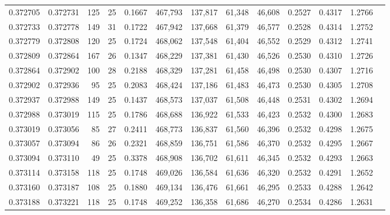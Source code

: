 \begin{tabular}{rrrrrrrrrrrrr}
0.372705 & 0.372731 &   125 &  25 &                                     0.1667 & 467,793 & 137,817 &  61,348 &  46,608 & 0.2527 & 0.4317 & 1.2766 \\
0.372733 & 0.372778 &   149 &  31 &                                     0.1722 & 467,942 & 137,668 &  61,379 &  46,577 & 0.2528 & 0.4314 & 1.2752 \\
0.372779 & 0.372808 &   120 &  25 &                                     0.1724 & 468,062 & 137,548 &  61,404 &  46,552 & 0.2529 & 0.4312 & 1.2741 \\
0.372809 & 0.372864 &   167 &  26 &                                     0.1347 & 468,229 & 137,381 &  61,430 &  46,526 & 0.2530 & 0.4310 & 1.2726 \\
0.372864 & 0.372902 &   100 &  28 &                                     0.2188 & 468,329 & 137,281 &  61,458 &  46,498 & 0.2530 & 0.4307 & 1.2716 \\
0.372902 & 0.372936 &    95 &  25 &                                     0.2083 & 468,424 & 137,186 &  61,483 &  46,473 & 0.2530 & 0.4305 & 1.2708 \\
0.372937 & 0.372988 &   149 &  25 &                                     0.1437 & 468,573 & 137,037 &  61,508 &  46,448 & 0.2531 & 0.4302 & 1.2694 \\
0.372988 & 0.373019 &   115 &  25 &                                     0.1786 & 468,688 & 136,922 &  61,533 &  46,423 & 0.2532 & 0.4300 & 1.2683 \\
0.373019 & 0.373056 &    85 &  27 &                                     0.2411 & 468,773 & 136,837 &  61,560 &  46,396 & 0.2532 & 0.4298 & 1.2675 \\
0.373057 & 0.373094 &    86 &  26 &                                     0.2321 & 468,859 & 136,751 &  61,586 &  46,370 & 0.2532 & 0.4295 & 1.2667 \\
0.373094 & 0.373110 &    49 &  25 &                                     0.3378 & 468,908 & 136,702 &  61,611 &  46,345 & 0.2532 & 0.4293 & 1.2663 \\
0.373114 & 0.373158 &   118 &  25 &                                     0.1748 & 469,026 & 136,584 &  61,636 &  46,320 & 0.2532 & 0.4291 & 1.2652 \\
0.373160 & 0.373187 &   108 &  25 &                                     0.1880 & 469,134 & 136,476 &  61,661 &  46,295 & 0.2533 & 0.4288 & 1.2642 \\
0.373188 & 0.373221 &   118 &  25 &                                     0.1748 & 469,252 & 136,358 &  61,686 &  46,270 & 0.2534 & 0.4286 & 1.2631 \\

\end{tabular}
